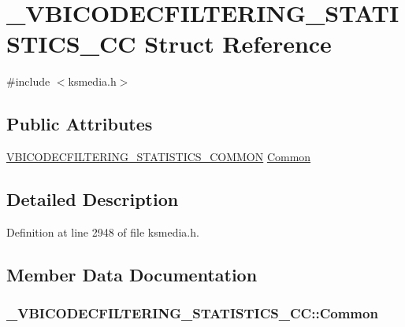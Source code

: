 \hypertarget{struct___v_b_i_c_o_d_e_c_f_i_l_t_e_r_i_n_g___s_t_a_t_i_s_t_i_c_s___c_c}{}\section{\+\_\+\+V\+B\+I\+C\+O\+D\+E\+C\+F\+I\+L\+T\+E\+R\+I\+N\+G\+\_\+\+S\+T\+A\+T\+I\+S\+T\+I\+C\+S\+\_\+\+CC Struct Reference}
\label{struct___v_b_i_c_o_d_e_c_f_i_l_t_e_r_i_n_g___s_t_a_t_i_s_t_i_c_s___c_c}


{\ttfamily \#include $<$ksmedia.\+h$>$}

\subsection*{Public Attributes}
\begin{DoxyCompactItemize}
\item 
\hyperlink{ksmedia_8h_af85d0f07aedee27503bd16ce75507f60}{V\+B\+I\+C\+O\+D\+E\+C\+F\+I\+L\+T\+E\+R\+I\+N\+G\+\_\+\+S\+T\+A\+T\+I\+S\+T\+I\+C\+S\+\_\+\+C\+O\+M\+M\+ON} \hyperlink{struct___v_b_i_c_o_d_e_c_f_i_l_t_e_r_i_n_g___s_t_a_t_i_s_t_i_c_s___c_c_a87a2295b6a2a76a6eeeede71f56fd708}{Common}
\end{DoxyCompactItemize}


\subsection{Detailed Description}


Definition at line 2948 of file ksmedia.\+h.



\subsection{Member Data Documentation}
\subsubsection[{\texorpdfstring{Common}{Common}}]{ \+\_\+\+V\+B\+I\+C\+O\+D\+E\+C\+F\+I\+L\+T\+E\+R\+I\+N\+G\+\_\+\+S\+T\+A\+T\+I\+S\+T\+I\+C\+S\+\_\+\+C\+C\+::\+Common}\hypertarget{struct___v_b_i_c_o_d_e_c_f_i_l_t_e_r_i_n_g___s_t_a_t_i_s_t_i_c_s___c_c_a87a2295b6a2a76a6eeeede71f56fd708}{}\label{struct___v_b_i_c_o_d_e_c_f_i_l_t_e_r_i_n_g___s_t_a_t_i_s_t_i_c_s___c_c_a87a2295b6a2a76a6eeeede71f56fd708}


